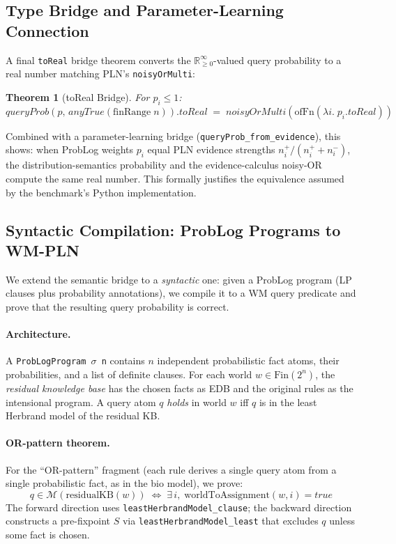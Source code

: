 \documentclass[]{article}
\newtheorem{theorem}{Theorem}
\newcommand{\code}[1]{\texttt{#1}}
\begin{document}
\subsection{Type Bridge and Parameter-Learning Connection}

A final \code{toReal} bridge theorem converts the $\mathbb{R}_{\geq 0}^\infty$-valued
query probability to a real number matching PLN's \code{noisyOrMulti}:

\begin{theorem}[toReal Bridge]
\label{thm:toreal}
For $p_i \le 1$:
\[
  \mathit{queryProb}(p,\, \mathit{anyTrue}(\mathrm{finRange}\;n)).\mathit{toReal}
  \;=\; \mathit{noisyOrMulti}(\mathrm{ofFn}(\lambda i.\; p_i.\mathit{toReal}))
\]
\end{theorem}

\noindent
Combined with a parameter-learning bridge (\code{queryProb\_from\_evidence}),
this shows: when ProbLog weights $p_i$ equal PLN evidence strengths
$n_i^+ / (n_i^+ + n_i^-)$, the distribution-semantics probability and
the evidence-calculus noisy-OR compute the same real number.  This formally
justifies the equivalence assumed by the benchmark's Python implementation.

\subsection{Syntactic Compilation: ProbLog Programs to WM-PLN}
\label{sec:compilation}

We extend the semantic bridge to a \emph{syntactic} one: given a ProbLog program
(LP clauses plus probability annotations), we compile it to a WM query predicate
and prove that the resulting query probability is correct.

\paragraph{Architecture.}
A \code{ProbLogProgram~$\sigma$~n} contains $n$ independent probabilistic fact
atoms, their probabilities, and a list of definite clauses.  For each world
$w \in \mathrm{Fin}(2^n)$, the \emph{residual knowledge base} has the chosen
facts as EDB and the original rules as the intensional program.  A query atom $q$
\emph{holds} in world $w$ iff $q$ is in the least Herbrand model of the residual KB.

\paragraph{OR-pattern theorem.}
For the ``OR-pattern'' fragment (each rule derives a single query atom from a single
probabilistic fact, as in the bio model), we prove:
\[
  q \in \mathcal{M}(\text{residualKB}(w))
  \;\Longleftrightarrow\;
  \exists\, i,\; \text{worldToAssignment}(w, i) = \mathit{true}
\]
The forward direction uses \code{leastHerbrandModel\_clause}; the backward
direction constructs a pre-fixpoint $S$ via \code{leastHerbrandModel\_least}
that excludes $q$ unless some fact is chosen.
\end{document}
